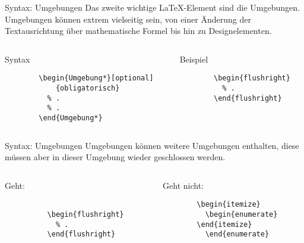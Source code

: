 \begin{frame}[fragile]{Syntax: Umgebungen}
  Das zweite wichtige \LaTeX-Element sind die Umgebungen.
  Umgebungen können extrem vielseitig sein, von einer Änderung der Textausrichtung über mathematische Formel bis hin zu Designelementen.
  \begin{columns}[onlytextwidth, t]
    \begin{column}{0.48\textwidth}
      \begin{block}{Syntax}
        \begin{lstlisting}
        \begin{Umgebung*}[optional]
            {obligatorisch}
          % .
          % .
        \end{Umgebung*}
        \end{lstlisting}
      \end{block}
    \end{column}
    \begin{column}{0.48\textwidth}
      \begin{block}{Beispiel}
        \begin{lstlisting}
        \begin{flushright}
          % .
        \end{flushright}
        \end{lstlisting}
      \end{block}
    \end{column}
  \end{columns}
\end{frame}

\begin{frame}[fragile]{Syntax: Umgebungen}
  Umgebungen können weitere Umgebungen enthalten, diese müssen aber in dieser Umgebung wieder geschlossen werden.
  \begin{columns}[onlytextwidth, t]
    \begin{column}{0.48\textwidth}
      \begin{block}{Geht:}
        \begin{lstlisting}
        
          \begin{flushright}
            % .
          \end{flushright}
        
        \end{lstlisting}
      \end{block}
    \end{column}
    \begin{column}{0.48\textwidth}
      \begin{alertblock}{Geht nicht:}
        \begin{lstlisting}
        \begin{itemize}
          \begin{enumerate}
        \end{itemize}
          \end{enumerate}
        \end{lstlisting}
      \end{alertblock}
    \end{column}
  \end{columns}
\end{frame}

